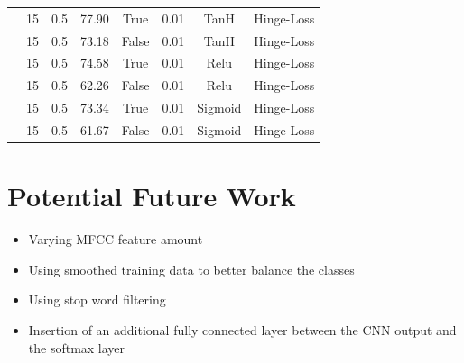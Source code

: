 \documentclass[a0,landscape]{a0poster}
\begin{document}
\begin{multicols}{3}
\begin{center}
\begin{tabular}{c | c |c | c | c | c | c | c }
		\hline
		\hline
		{\multirow{6}{*}{\rotatebox[origin=c]{90}{Acolex}}} & \cellcolor{lightgreen}15 & \cellcolor{lightgreen}0.5 & \cellcolor{lightgreen}77.90 & \cellcolor{lightgreen}True & \cellcolor{lightgreen}0.01 & \cellcolor{lightgreen}TanH & \cellcolor{lightgreen}Hinge-Loss\\
		& 15 & 0.5 & 73.18 & False & 0.01 & TanH & Hinge-Loss\\
		& \cellcolor{lightgreen}15 & \cellcolor{lightgreen}0.5 & \cellcolor{lightgreen}74.58 & \cellcolor{lightgreen}True & \cellcolor{lightgreen}0.01 & \cellcolor{lightgreen}Relu & \cellcolor{lightgreen}Hinge-Loss\\
		& 15 & 0.5 & 62.26 & False & 0.01 & Relu & Hinge-Loss\\
		& \cellcolor{lightgreen}15 & \cellcolor{lightgreen}0.5 & \cellcolor{lightgreen}73.34 & \cellcolor{lightgreen}True & \cellcolor{lightgreen}0.01 & \cellcolor{lightgreen}Sigmoid & \cellcolor{lightgreen}Hinge-Loss\\
		& 15 & 0.5 & 61.67 & False & 0.01 & Sigmoid & Hinge-Loss\\
	
	\end{tabular}
\end{center}
\color{Black} %
\large

\section*{Potential Future Work}

	\begin{itemize}
		\item Varying MFCC feature amount
		\item Using smoothed training data to better balance the classes
		\item Using stop word filtering 
		\item Insertion of an additional fully connected layer between the CNN output and the softmax layer
	
	\end{itemize}		



\end{multicols}
\end{document}

